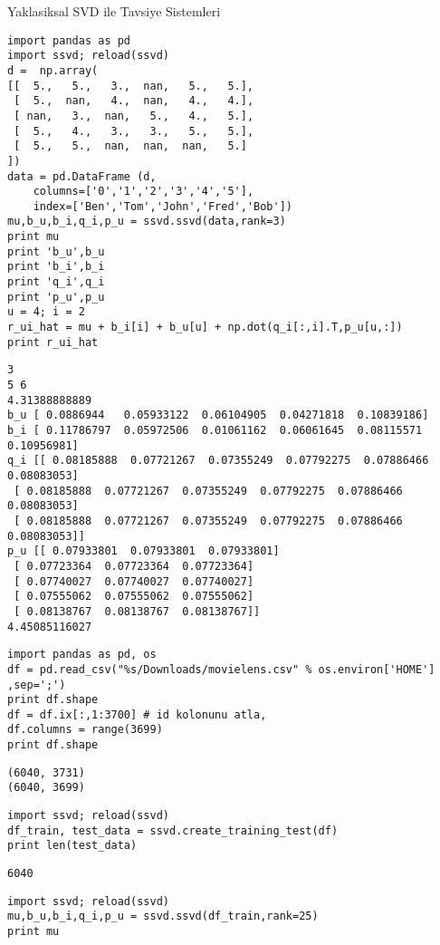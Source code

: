 \documentclass[12pt,fleqn]{article}\usepackage{../common}
\begin{document}
Yaklasiksal SVD ile Tavsiye Sistemleri

\begin{verbatim}
import pandas as pd
import ssvd; reload(ssvd)
d =  np.array(
[[  5.,   5.,   3.,  nan,   5.,   5.],
 [  5.,  nan,   4.,  nan,   4.,   4.],
 [ nan,   3.,  nan,   5.,   4.,   5.],
 [  5.,   4.,   3.,   3.,   5.,   5.],
 [  5.,   5.,  nan,  nan,  nan,   5.]
])
data = pd.DataFrame (d,
    columns=['0','1','2','3','4','5'],
    index=['Ben','Tom','John','Fred','Bob'])
mu,b_u,b_i,q_i,p_u = ssvd.ssvd(data,rank=3)
print mu
print 'b_u',b_u
print 'b_i',b_i
print 'q_i',q_i
print 'p_u',p_u
u = 4; i = 2
r_ui_hat = mu + b_i[i] + b_u[u] + np.dot(q_i[:,i].T,p_u[u,:])
print r_ui_hat
\end{verbatim}

\begin{verbatim}
3
5 6
4.31388888889
b_u [ 0.0886944   0.05933122  0.06104905  0.04271818  0.10839186]
b_i [ 0.11786797  0.05972506  0.01061162  0.06061645  0.08115571  0.10956981]
q_i [[ 0.08185888  0.07721267  0.07355249  0.07792275  0.07886466  0.08083053]
 [ 0.08185888  0.07721267  0.07355249  0.07792275  0.07886466  0.08083053]
 [ 0.08185888  0.07721267  0.07355249  0.07792275  0.07886466  0.08083053]]
p_u [[ 0.07933801  0.07933801  0.07933801]
 [ 0.07723364  0.07723364  0.07723364]
 [ 0.07740027  0.07740027  0.07740027]
 [ 0.07555062  0.07555062  0.07555062]
 [ 0.08138767  0.08138767  0.08138767]]
4.45085116027
\end{verbatim}


\begin{verbatim}
import pandas as pd, os
df = pd.read_csv("%s/Downloads/movielens.csv" % os.environ['HOME'] ,sep=';')
print df.shape
df = df.ix[:,1:3700] # id kolonunu atla,
df.columns = range(3699)
print df.shape
\end{verbatim}

\begin{verbatim}
(6040, 3731)
(6040, 3699)
\end{verbatim}

\begin{verbatim}
import ssvd; reload(ssvd)
df_train, test_data = ssvd.create_training_test(df)
print len(test_data)
\end{verbatim}

\begin{verbatim}
6040
\end{verbatim}


\begin{verbatim}
import ssvd; reload(ssvd)
mu,b_u,b_i,q_i,p_u = ssvd.ssvd(df_train,rank=25)
print mu
\end{verbatim}
\end{document}
